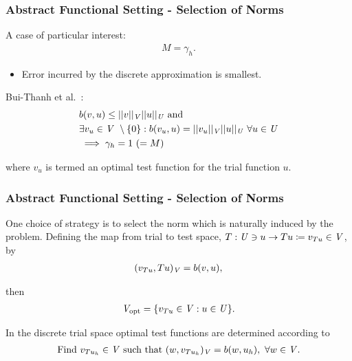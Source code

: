 \begin{frame}
\frametitle{Abstract Functional Setting - Selection of Norms}

A case of particular interest:
\begin{align} \label{eq:equal_m_gamma}
M = \gamma_h.
\end{align}

\begin{itemize}
  \item Error incurred by the discrete approximation is smallest.
\end{itemize}
\vspace{5mm}

Bui-Thanh et al.~\cite[Theorem ]{BuiThanh2013}:
\begin{align} \label{eq:bui_thanh_2-6}
 &  b(v,u) \le ||v||_{\mathit{{{V}}}} ||u||_{\mathit{{{U}}}}\ \text{and}\ \\
 & \exists v_u \in \mathit{{{V}}}\ \setminus \{0\} :
b(v_u,u) = ||v_u||_{\mathit{{{V}}}} ||u||_{\mathit{{{U}}}}\ \forall u \in \mathit{{{U}}} \\
& \implies \gamma_h = 1\ (= M)
\end{align}

where $v_u$ is termed an optimal test function for the trial function $u$.

\end{frame}

\begin{frame}
\frametitle{Abstract Functional Setting - Selection of Norms}

One choice of strategy is to select the norm which is naturally induced by the
problem. Defining the map from trial to test space,
$T: \mathit{{{U}}} \ni u \rightarrow Tu \coloneqq v_{Tu} \in \mathit{{{V}}} $, by
\begin{align}
(v_{Tu},Tu)_{\mathit{{{V}}}} = b(v,u),
\end{align}

then
\begin{align} \label{eq:def_discrete_test_space_alt}
\mathit{{{V}}}_\text{opt} = \{ v_{T u} \in \mathit{{{V}}} : u \in \mathit{{{U}}} \}.
\end{align}

In the discrete trial space optimal test functions are determined according to
\begin{align} \label{eq:auxiliary_opt_v}
\text{Find}\ v_{T u_h} \in \mathit{{{V}}}\ \text{such that}\
(w,v_{T u_h})_{\mathit{{{V}}}} = b(w,u_h),\ \forall w \in \mathit{{{V}}}.
\end{align}

\end{frame}
